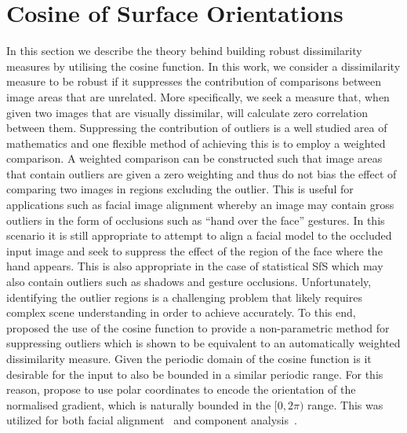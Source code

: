 \section{Cosine of Surface Orientations}\label{sec:singl_img_cosine_orientations}
In this section we describe the theory behind building robust dissimilarity
measures by utilising the cosine function. In this work, we consider a
dissimilarity measure to be robust if it suppresses the contribution of
comparisons between image areas that are unrelated. More specifically, we seek a
measure that, when given two images that are visually dissimilar, will calculate
zero correlation between them. Suppressing the contribution of outliers is
a well studied area of mathematics and one flexible method of achieving this
is to employ a weighted comparison. A weighted comparison can be constructed
such that image areas that contain outliers are given a zero weighting and thus
do not bias the effect of comparing two images in regions excluding the outlier.
This is useful for applications such as facial image alignment whereby an image
may contain gross outliers in the form of occlusions such as ``hand over the
face'' gestures. In this scenario it is still appropriate to attempt to
align a facial model to the occluded input image and seek to suppress
the effect of the region of the face where the hand appears. This is also
appropriate in the case of statistical SfS which may also contain outliers
such as shadows and gesture occlusions. Unfortunately, identifying the outlier
regions is a challenging problem that likely requires complex scene
understanding in order to achieve accurately.
To this end, \citet{tzimiropoulos2012subspace} proposed the use of the cosine
function to provide a non-parametric method for suppressing outliers which
is shown to be equivalent to an automatically weighted dissimilarity measure.
Given the periodic domain of the cosine function is it desirable for the
input to also be bounded in a similar periodic range. For this reason,
\citet{tzimiropoulos2012subspace} propose to use polar coordinates to encode
the orientation of the normalised gradient, which is naturally bounded in the
$[0, 2\pi)$ range. This was utilized for both facial
alignment~\cite{tzimiropoulos2011robust,tzimiropoulos2014active,%
antonakos2015feature} and component
analysis~\cite{tzimiropoulos2012subspace,tzimiropoulos2014active}.


